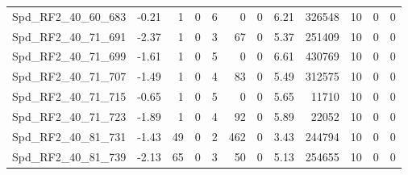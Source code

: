 \begin{longtable}[c]{@{}lrrrrrrrrrrr@{}}
Spd\_RF2\_40\_60\_683        & -0.21                  & 1                       & 0                       & 6                      & 0                       & 0                       & 6.21                    & 326548                   & 10                       & 0                        & 0                        \\
Spd\_RF2\_40\_71\_691        & -2.37                  & 1                       & 0                       & 3                      & 67                      & 0                       & 5.37                    & 251409                   & 10                       & 0                        & 0                        \\
Spd\_RF2\_40\_71\_699        & -1.61                  & 1                       & 0                       & 5                      & 0                       & 0                       & 6.61                    & 430769                   & 10                       & 0                        & 0                        \\
Spd\_RF2\_40\_71\_707        & -1.49                  & 1                       & 0                       & 4                      & 83                      & 0                       & 5.49                    & 312575                   & 10                       & 0                        & 0                        \\
Spd\_RF2\_40\_71\_715        & -0.65                  & 1                       & 0                       & 5                      & 0                       & 0                       & 5.65                    & 11710                    & 10                       & 0                        & 0                        \\
Spd\_RF2\_40\_71\_723        & -1.89                  & 1                       & 0                       & 4                      & 92                      & 0                       & 5.89                    & 22052                    & 10                       & 0                        & 0                        \\
Spd\_RF2\_40\_81\_731        & -1.43                  & 49                      & 0                       & 2                      & 462                     & 0                       & 3.43                    & 244794                   & 10                       & 0                        & 0                        \\
Spd\_RF2\_40\_81\_739        & -2.13                  & 65                      & 0                       & 3                      & 50                      & 0                       & 5.13                    & 254655                   & 10                       & 0                        & 0                        \\

\end{longtable}
